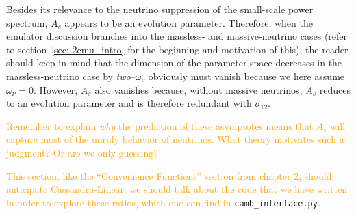 Besides its relevance to the neutrino suppression of the small-scale power
spectrum, $A_s$ appears to be an evolution parameter. Therefore, when the
emulator discussion branches into the massless- and massive-neutrino cases
(refer to section~\ref{sec: 2emu_intro} for the beginning and motivation of
this), the reader should keep in mind that the dimension of the parameter
space decreases in the massless-neutrino case by \textit{two}--$\omega_\nu$ 
obviously must vanish because we here assume $\omega_\nu=0$. However, $A_s$
also vanishes because, without massive neutrinos, $A_s$ reduces to an
evolution parameter and is therefore redundant with $\sigma_{12}$.


\textcolor{orange}{Remember to explain \textit{why} the prediction of these 
asymptotes means that $A_s$ will capture most of the unruly behavior of 
neutrinos. What theory motivates such a judgment? Or are we only guessing?}

\textcolor{orange}{This section, like the ``Convenience Functions'' section
from chapter 2, should anticipate Cassandra-Linear: we should talk about the
code that we have written in order to explore these ratios, which one can find
in} \verb|camb_interface.py|.
